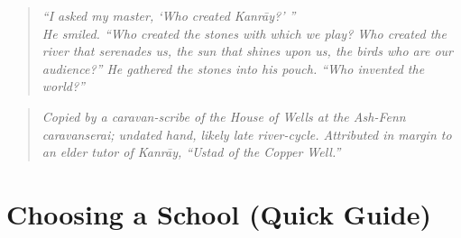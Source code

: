 \documentclass[11pt]{article}
\renewcommand{\arraystretch}{1.15}
\begin{document}
\clearpage


\begin{quote}\small\itshape
``I asked my master, `Who created Kanrāy?' ''\\[2pt]
He smiled. ``Who created the stones with which we play? Who created the river that serenades us, the sun that shines upon us, the birds who are our audience?'' 
He gathered the stones into his pouch. ``Who invented the world?''
\end{quote}

\begin{quote}\footnotesize\itshape
Copied by a caravan-scribe of the House of Wells at the Ash-Fenn caravanserai; undated hand, likely late river-cycle. 
Attributed in margin to an elder tutor of Kanrāy, ``Ustad of the Copper Well.'' 
\end{quote}

\section*{Choosing a School (Quick Guide)}

\setlength{\tabcolsep}{3pt}
\renewcommand{\arraystretch}{1.12}

\bigskip
\end{document}

